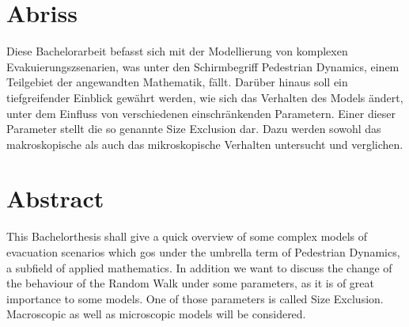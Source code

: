 \section*{Abriss}
Diese Bachelorarbeit befasst sich mit der Modellierung von komplexen Evakuierungszsenarien,
was unter den Schirmbegriff Pedestrian Dynamics, einem Teilgebiet der angewandten Mathematik, fällt.
Darüber hinaus soll ein tiefgreifender Einblick gewährt werden, wie sich das Verhalten des Models ändert, 
unter dem Einfluss von verschiedenen einschränkenden Parametern. Einer dieser Parameter stellt die so genannte Size Exclusion dar. 
Dazu werden sowohl das makroskopische als auch das mikroskopische Verhalten untersucht und verglichen. 

\vspace{1.5cm}
\section*{Abstract}
This Bachelorthesis shall give a quick overview of some complex models of evacuation scenarios
which gos under the umbrella term of Pedestrian Dynamics, a subfield of applied mathematics. 
In addition we want to discuss the change of the behaviour of the Random Walk under some parameters, 
as it is of great importance to some models. One of those parameters is called Size Exclusion. 
Macroscopic as well as microscopic models will be considered. 
